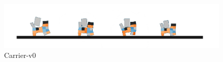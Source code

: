 \begin{figure}[H]
    \centering
    \includegraphics[scale=0.9]{images/task_carrier.pdf}
    \caption{Carrier-v0}
    \label{fig:task_carrier}
\end{figure}

\newpage